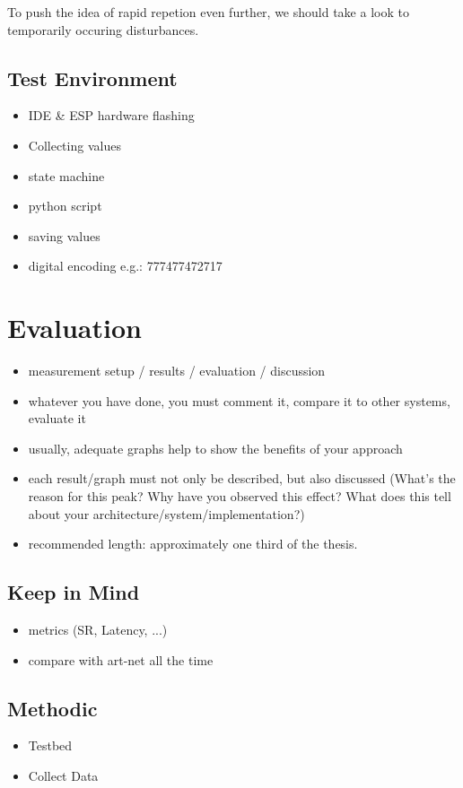 \documentclass[]{ccs-thesis}
\begin{document}
To push the idea of rapid repetion even further, we should take a look to temporarily occuring disturbances.

\section{Test Environment}
\begin{itemize}
\item IDE \& ESP hardware flashing
\item Collecting values
\item state machine
\item python script
\item saving values
\item digital encoding e.g.: 777477472717
\end{itemize}

\chapter{Evaluation}
\begin{itemize}
\item measurement setup / results / evaluation / discussion
\item whatever you have done, you must comment it, compare it to other systems, evaluate it
\item usually, adequate graphs help to show the benefits of your approach
\item each result/graph must not only be described, but also discussed (What's the reason for this peak? Why have you observed this effect? What does this tell about your architecture/system/implementation?)
\item recommended length: approximately one third of the thesis.
\end{itemize}

\section*{Keep in Mind}
\begin{itemize}
\item metrics (SR, Latency, ...)
\item compare with art-net all the time
\end{itemize}

\section{Methodic}
\begin{itemize}
	\item Testbed
	\item Collect Data
\end{itemize}
\end{document}
